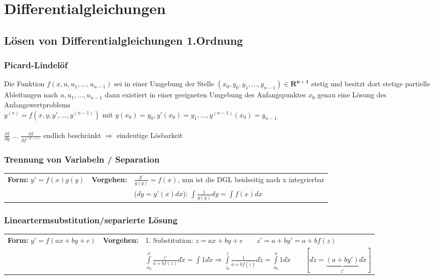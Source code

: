 \renewcommand{\arraystretch}{1}
\section{Differentialgleichungen}

\subsection{Lösen von Differentialgleichungen 1.Ordnung}

\subsubsection{Picard-Lindelöf}
Die Funktion $f(x, u, u_1, ..., u_{n-1})$ sei in einer Umgebung der Stelle $(x_0, y_0, y_1, ..., y_{n-1}) \in \mathbf{R^{n+1}}$ stetig und besitzt dort stetige partielle Ableitungen
nach $u, u_1, ..., u_{n-1}$ dann existiert in einer geeigneten Umgebung des Anfangspunktes $x_0$ genau eine Lösung des Anfangswertproblems\\
$y^{(n)} = f(x, y, y', ...,y^{(n-1)})$ mit $y(x_0) = y_0, y'(x_0) = y_1, ..., y^{(n-1)}(x_0) = y_{n-1}$ \\ \\
$\frac{\partial f}{\partial y}$ ... $\frac{\partial f}{\partial f^{(n-1)}}$ endlich beschränkt $\Rightarrow$ eindeutige Lösbarkeit


\subsubsection{Trennung von Variabeln / Separation }
\begin{tabular}{p{4cm}p{1.5cm}p{10.5cm}}
\textbf{Form:} $y' = f(x) g(y)$ &
\textbf{Vorgehen:}              &
$\frac{y'}{g(y)} = f(x)$, nun ist die DGL beidseitig nach x integrierbar\\  &&
($dy = y'(x) dx$): $\int \frac{1}{g(y)} dy = \int f(x) dx$ 
\end{tabular}

\subsubsection{Lineartermsubstitution/separierte Lösung}
\begin{tabular}{p{4cm}p{1.5cm}p{10.5cm}}
\textbf{Form:} $y'=f(ax+by+c)$   &
\textbf{Vorgehen:}               &
1. Substitution: $z=ax+by+c \qquad z'=a+by' =a+bf(z)$\\ &&
$\int\limits_{x_0}^{x}\frac{z'}{a+bf(z)}d\tilde{x} = \int 1 d\tilde{x} \Rightarrow \int\limits_{z_0}^{z}\frac{1}{a+bf(\tilde{z})}d\tilde{z} = \int\limits_{x_0}^{x}1 d\tilde{x} \qquad [d\tilde{z} = \underbrace{(a+by')}_{z'} d\tilde{x}]$
\end{tabular}

